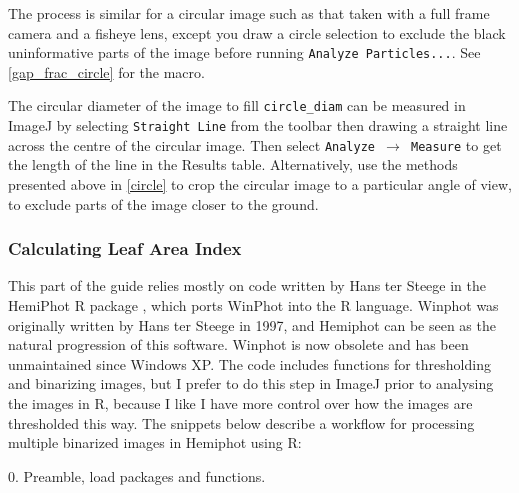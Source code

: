 \documentclass[11pt,a4paper]{article}
\newcommand\menu[1]{\texttt{\color{blue}#1}}  %
\newcommand\file[1]{\texttt{\underline{#1}}}  %
\begin{document}
\begin{minipage}{\linewidth}

\end{minipage}

The process is similar for a circular image such as that taken with a full frame camera and a fisheye lens, except you draw a circle selection to exclude the black uninformative parts of the image before running \menu{Analyze Particles...}. See \autoref{gap_frac_circle} for the macro. 

\begin{minipage}{\linewidth}

\end{minipage}

The circular diameter of the image to fill \verb|circle_diam| can be measured in ImageJ by selecting \menu{Straight Line} from the toolbar then drawing a straight line across the centre of the circular image. Then select \menu{Analyze $\rightarrow$ Measure} to get the length of the line in the Results table. Alternatively, use the methods presented above in \autoref{circle} to crop the circular image to a particular angle of view, to exclude parts of the image closer to the ground.

\subsubsection{Calculating Leaf Area Index}

This part of the guide relies mostly on code written by Hans ter Steege in the HemiPhot R package \citep{Steege2018}, which ports WinPhot into the R language. Winphot was originally written by Hans ter Steege in 1997, and Hemiphot can be seen as the natural progression of this software. Winphot is now obsolete and has been unmaintained since Windows XP. The code includes functions for thresholding and binarizing images, but I prefer to do this step in ImageJ prior to analysing the images in R, because I like I have more control over how the images are thresholded this way. The snippets below describe a workflow for processing multiple binarized images in Hemiphot using R:

\vspace{0.5cm}
\begin{minipage}{\linewidth}
0. Preamble, load packages and functions.

\end{minipage}
\end{document}
